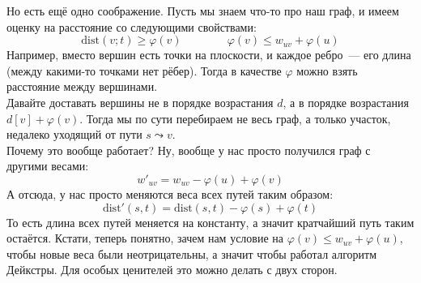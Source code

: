 \documentclass{article}
\begin{document}
    Но есть ещё одно соображение. Пусть мы знаем что-то про наш граф, и имеем оценку на расстояние со следующими свойствами:
    $$
    \mathrm{dist}(v;t)\geqslant\varphi(v)\qquad\qquad\varphi(v)\leqslant w_{uv}+\varphi(u)
    $$
    Например, вместо вершин есть точки на плоскости, и каждое ребро~--- его длина (между какими-то точками нет рёбер). Тогда в качестве $\varphi$ можно взять расстояние между вершинами.\\
    Давайте доставать вершины не в порядке возрастания $d$, а в порядке возрастания $d[v]+\varphi(v)$. Тогда мы по сути перебираем не весь граф, а только участок, недалеко уходящий от пути $s\leadsto v$.\\
    Почему это вообще работает? Ну, вообще у нас просто получился граф с другими весами:
    $$w'_{uv}=w_{uv}-\varphi(u)+\varphi(v)$$
    А отсюда, у нас просто меняются веса всех путей таким образом:
    $$
    \mathrm{dist}'(s,t)=\mathrm{dist}(s,t)-\varphi(s)+\varphi(t)
    $$
    То есть длина всех путей меняется на константу, а значит кратчайший путь таким остаётся. Кстати, теперь понятно, зачем нам условие на $\varphi(v)\leqslant w_{uv}+\varphi(u)$, чтобы новые веса были неотрицательны, а значит чтобы работал алгоритм Дейкстры. Для особых ценителей это можно делать с двух сторон.
\end{document}
